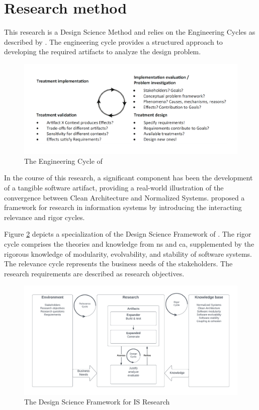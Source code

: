 \section{Research method} \label{sec_research_method}

This research is a Design Science Method and relies on the Engineering Cycles as described
by \textcite{wieringa_design_2014}. The engineering cycle provides a structured approach
to developing the required artifacts to analyze the design problem.

\begin{figure}[H]
    \centering
    \includegraphics[width=1\textwidth]{figures/engineering_cycle.pdf}
    \caption[Engineering cycle]{The Engineering Cycle of \textcite{wieringa_design_2014}}
    \label{fig_engineering_cycle}
\end{figure}

In the course of this research, a significant component has been the development of a
tangible software artifact, providing a real-world illustration of the convergence between
Clean Architecture and Normalized Systems. \textcite{hevner_design_2004} proposed a
framework for research in information systems by introducing the interacting relevance and
rigor cycles.

Figure \ref{fig_dsr} depicts a specialization of the Design Science Framework of
\textcite{hevner_design_2004}. The rigor cycle comprises the theories and knowledge from
\gls{ns} and \gls{ca}, supplemented by the rigorous knowledge of modularity, evolvability,
and stability of software systems. The relevance cycle represents the business needs of
the stakeholders. The research requirements are described as research objectives.

\begin{figure}[H]
    \centering
    \includegraphics[width=1\textwidth]{figures/rigor_relevance_cycle.pdf}
    \caption[Design Science Framework for IS Research]{The Design Science Framework for IS Research}
    \label{fig_dsr}
\end{figure}